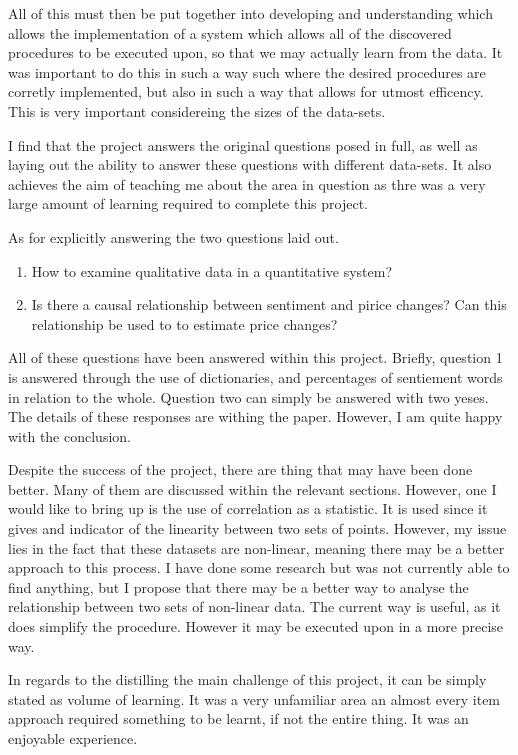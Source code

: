All of this must then be put together into developing and understanding which allows the implementation of a system which allows all of the discovered procedures to be executed upon, so that we may actually learn from the data. It was important to do this in such a way such where the desired procedures are corretly implemented, but also in such a way that allows for utmost efficency. This is very important considereing the sizes of the data-sets.

I find that the project answers the original questions posed in full, as well as laying out the ability to answer these questions with different data-sets. It also achieves the aim of teaching me about the area in question as thre was a very large amount of learning required to complete this project.

As for explicitly answering the two questions laid out.
\begin{enumerate}
    \item How to examine qualitative data in a quantitative system?
    \item Is there a causal relationship between sentiment and pirice changes? Can this relationship be used to to estimate price changes?
\end{enumerate}
All of these questions have been answered within this project. Briefly, question 1 is answered through the use of dictionaries, and percentages of sentiement words in relation to the whole. Question two can simply be answered with two yeses. The details of these responses are withing the paper. However, I am quite happy with the conclusion.

Despite the success of the project, there are thing that may have been done better. Many of them are discussed within the relevant sections. However, one I would like to bring up is the use of correlation as a statistic. It is used since it gives and indicator of the linearity between two sets of points. However, my issue lies in the fact that these datasets are non-linear, meaning there may be a better approach to this process. I have done some research but was not currently able to find anything, but I propose that there may be a better way to analyse the relationship between two sets of non-linear data. The current way is useful, as it does simplify the procedure. However it may be executed upon in a more precise way.

In regards to the distilling the main challenge of this project, it can be simply stated as volume of learning. It was a very unfamiliar area an almost every item approach required something to be learnt, if not the entire thing. It was an enjoyable experience.

